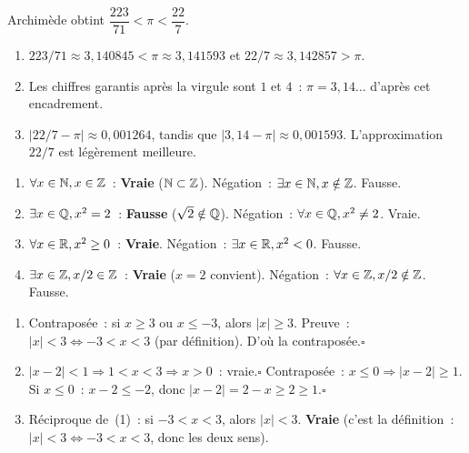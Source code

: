 
Archim\`ede obtint $\dfrac{223}{71}<\pi<\dfrac{22}{7}$.

\begin{enumerate}
  \item $223/71\approx3{,}140845<\pi\approx3{,}141593$
        et $22/7\approx3{,}142857>\pi$.
  \item Les chiffres garantis apr\`es la virgule sont $1$ et $4$~:
        $\pi=3{,}14\ldots$ d'apr\`es cet encadrement.
  \item $|22/7-\pi|\approx0{,}001264$, tandis que
        $|3{,}14-\pi|\approx0{,}001593$.
        L'approximation $22/7$ est l\'eg\`erement meilleure.
\end{enumerate}


\begin{enumerate}
  \item $\forall x\in\mathbb{N}, x\in\mathbb{Z}$~: \textbf{Vraie} ($\mathbb{N}\subset\mathbb{Z}$).
        N\'egation~: $\exists x\in\mathbb{N}, x\notin\mathbb{Z}$. Fausse.
  \item $\exists x\in\mathbb{Q}, x^2=2$~: \textbf{Fausse} ($\sqrt{2}\notin\mathbb{Q}$).
        N\'egation~: $\forall x\in\mathbb{Q}, x^2\ne2$. Vraie.
  \item $\forall x\in\mathbb{R}, x^2\geq0$~: \textbf{Vraie}.
        N\'egation~: $\exists x\in\mathbb{R}, x^2<0$. Fausse.
  \item $\exists x\in\mathbb{Z}, x/2\in\mathbb{Z}$~: \textbf{Vraie} ($x=2$ convient).
        N\'egation~: $\forall x\in\mathbb{Z}, x/2\notin\mathbb{Z}$. Fausse.
\end{enumerate}


\begin{enumerate}
  \item Contrapos\'ee~: si $x\geq3$ ou $x\leq-3$, alors $|x|\geq3$.
        Preuve~: $|x|<3\Leftrightarrow-3<x<3$ (par d\'efinition). D'o\`u la contrapos\'ee.\hfill$\square$
  \item $|x-2|<1\Rightarrow1<x<3\Rightarrow x>0$~: vraie.\hfill$\square$
        Contrapos\'ee~: $x\leq0\Rightarrow|x-2|\geq1$.
        Si $x\leq0$~: $x-2\leq-2$, donc $|x-2|=2-x\geq2\geq1$.\hfill$\square$
  \item R\'eciproque de~(1)~: si $-3<x<3$, alors $|x|<3$. \textbf{Vraie}
        (c'est la d\'efinition~: $|x|<3\Leftrightarrow-3<x<3$, donc les deux sens).
\end{enumerate}

